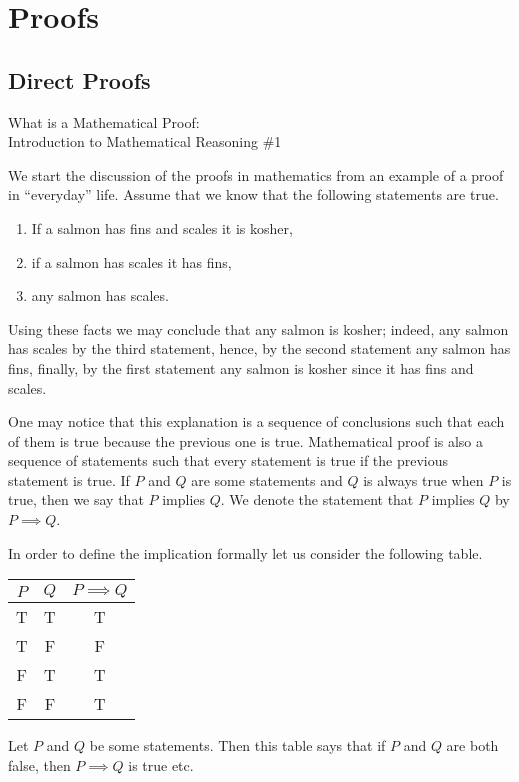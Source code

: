 \chapter{Proofs}
\section{Direct Proofs}
\begin{marginfigure}
  {\scriptsize What is a Mathematical Proof:\\\noindent
  Introduction to Mathematical Reasoning \#1}
  \vskip 0.25cm
  \noindent
  \vskip 0.25cm
  \noindent
\end{marginfigure}

We start the discussion of the proofs in mathematics from an example of a proof
in ``everyday'' life. Assume that we know that the following statements are
true.
\begin{enumerate}
  \item If a salmon has fins and scales it is kosher,
  \item if a salmon has scales it has fins,
  \item any salmon has scales.
\end{enumerate}
Using these facts we may conclude that any salmon is kosher; indeed, any salmon
has scales by the third statement, hence, by the second statement any salmon has
fins, finally, by the first statement any salmon is kosher since it has fins and
scales.

One may notice that this explanation is a sequence of conclusions such that
each of them is true because the previous one is true.
Mathematical proof is also a sequence of statements such that every statement
is true if the previous statement is true. If $P$ and $Q$ are some statements
and $Q$ is always true when $P$ is true, then we say that $P$ implies $Q$.
We denote the statement that $P$ implies $Q$ by $P \implies Q$.

In order to define the implication formally let us consider the following table.
\begin{center}
  \begin{tabular}{ c | c | c }
    $P$ & $Q$ & $P \implies Q$ \\ \hline
    T   & T   & T \\
    T   & F   & F \\
    F   & T   & T \\
    F   & F   & T \\
  \end{tabular}
\end{center}
Let $P$ and $Q$ be some statements. Then this table says that if $P$ and $Q$
are both false, then $P \implies Q$ is true etc.

